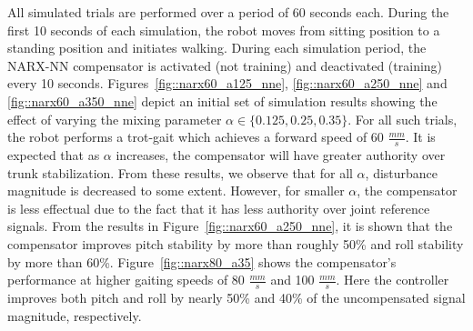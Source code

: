 			All simulated trials are performed over a period of 60 seconds each. During the first 10 seconds of each simulation, the robot moves from sitting position to a standing position and initiates walking. During each simulation period, the NARX-NN compensator is activated (not training)  and deactivated (training)  every 10 seconds. Figures~\ref{fig::narx60_a125_nne}, \ref{fig::narx60_a250_nne} and \ref{fig::narx60_a350_nne} depict an initial set of simulation results showing the effect of varying  the mixing parameter $\alpha\in\{0.125, 0.25, 0.35\}$. For all such trials, the robot performs a trot-gait which achieves a forward speed of 60 $\frac{mm}{s}$. It is expected that as $\alpha$ increases, the compensator will have greater authority over trunk stabilization. From these results, we observe that for all $\alpha$, disturbance magnitude is decreased to some extent. However, for smaller $\alpha$, the compensator is less effectual due to the fact that it has less authority over joint reference signals.  From the results in Figure~\ref{fig::narx60_a250_nne}, it is shown that the compensator improves pitch stability by more than roughly 50\% and roll stability by more than 60\%. Figure~\ref{fig::narx80_a35} shows the compensator's performance at higher gaiting speeds of 80 $\frac{mm}{s}$ and 100 $\frac{mm}{s}$. Here the controller improves both pitch and roll by nearly 50\% and 40\% of the  uncompensated signal magnitude, respectively.

			\newpage


